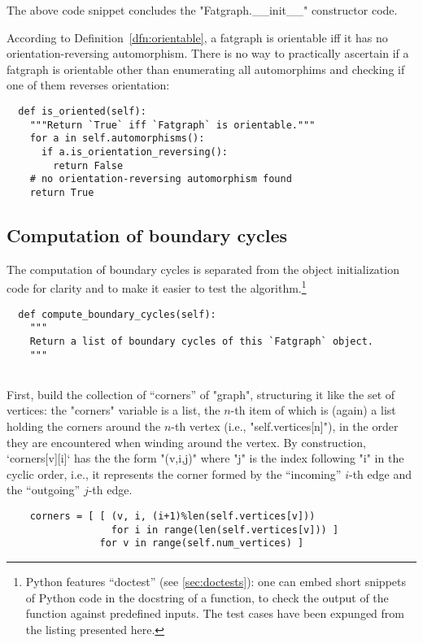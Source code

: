 The above code snippet concludes the "Fatgraph.__init__" constructor
code.

According to Definition~\ref{dfn:orientable}, a fatgraph is orientable iff it
has no orientation-reversing automorphism.  There is no
way to practically ascertain if a fatgraph is orientable other than
enumerating all automorphims and checking if one of them reverses orientation:
\begin{lstlisting}
  def is_oriented(self):
    """Return `True` iff `Fatgraph` is orientable."""
    for a in self.automorphisms():
      if a.is_orientation_reversing():
        return False
    # no orientation-reversing automorphism found
    return True

\end{lstlisting}


\subsection{Computation of boundary cycles}
\label{sec:compute-boundary-cycles}

The computation of boundary cycles is separated from the object
initialization code for clarity and to make it easier to test the
algorithm.\footnote{Python features ``doctest'' (see
  \ref{sec:doctests}): one can embed short snippets of Python code in
  the docstring of a function, to check the output of the function
  against predefined inputs.  The test cases have been expunged from
  the listing presented here.}
\begin{lstlisting}
  def compute_boundary_cycles(self):
    """
    Return a list of boundary cycles of this `Fatgraph` object.
    """
    
\end{lstlisting}
First, build the collection of ``corners'' of "graph", structuring it
like the set of vertices: the "corners" variable is a list, the $n$-th
item of which is (again) a list holding the corners around the $n$-th
vertex (i.e., "self.vertices[n]"), in the order they are encountered
when winding around the vertex.  By construction, `corners[v][i]` has
the the form "(v,i,j)" where "j" is the index following "i" in the
cyclic order, i.e., it represents the corner formed by the
``incoming'' $i$-th edge and the ``outgoing'' $j$-th edge.
\begin{lstlisting}
    corners = [ [ (v, i, (i+1)%len(self.vertices[v]))
                  for i in range(len(self.vertices[v])) ]
                for v in range(self.num_vertices) ]

\end{lstlisting}

